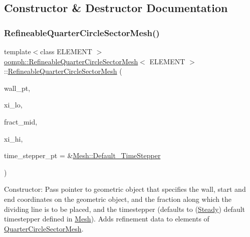 \subsection{Constructor \& Destructor Documentation}
\mbox{\label{classoomph_1_1RefineableQuarterCircleSectorMesh_a07b183ff3e548456e67b92b6fce41cde}} 
\subsubsection{\texorpdfstring{Refineable\+Quarter\+Circle\+Sector\+Mesh()}{RefineableQuarterCircleSectorMesh()}}
{\footnotesize\ttfamily template$<$class E\+L\+E\+M\+E\+NT $>$ \\
\hyperlink{classoomph_1_1RefineableQuarterCircleSectorMesh}{oomph\+::\+Refineable\+Quarter\+Circle\+Sector\+Mesh}$<$ E\+L\+E\+M\+E\+NT $>$\+::\hyperlink{classoomph_1_1RefineableQuarterCircleSectorMesh}{Refineable\+Quarter\+Circle\+Sector\+Mesh} (\begin{DoxyParamCaption}\item[{\hyperlink{classoomph_1_1GeomObject}{Geom\+Object} $\ast$}]{wall\+\_\+pt,  }\item[{const double \&}]{xi\+\_\+lo,  }\item[{const double \&}]{fract\+\_\+mid,  }\item[{const double \&}]{xi\+\_\+hi,  }\item[{\hyperlink{classoomph_1_1TimeStepper}{Time\+Stepper} $\ast$}]{time\+\_\+stepper\+\_\+pt = {\ttfamily \&\hyperlink{classoomph_1_1Mesh_a12243d0fee2b1fcee729ee5a4777ea10}{Mesh\+::\+Default\+\_\+\+Time\+Stepper}} }\end{DoxyParamCaption})\hspace{0.3cm}{\ttfamily [inline]}}



Constructor\+: Pass pointer to geometric object that specifies the wall, start and end coordinates on the geometric object, and the fraction along which the dividing line is to be placed, and the timestepper (defaults to (\hyperlink{classoomph_1_1Steady}{Steady}) default timestepper defined in \hyperlink{classoomph_1_1Mesh}{Mesh}). Adds refinement data to elements of \hyperlink{classoomph_1_1QuarterCircleSectorMesh}{Quarter\+Circle\+Sector\+Mesh}. 



